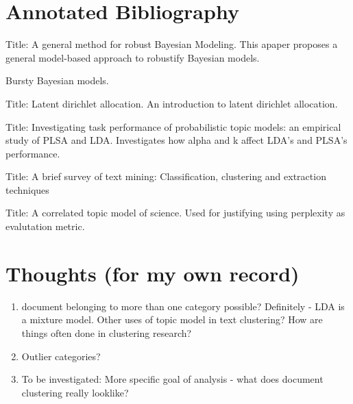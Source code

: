 \documentclass{article}
\begin{document}
\section{Annotated Bibliography}
\cite{wang2018general}
Title: A general method for robust Bayesian Modeling.
This apaper proposes a general model-based approach to robustify Bayesian models.

\cite{doyle2009accounting}
Bursty Bayesian models.

\cite{blei2003latent}
Title: Latent dirichlet allocation.
An introduction to latent dirichlet allocation.

\cite{lu2011investigating}
Title: Investigating task performance of probabilistic topic models: an empirical study of PLSA and LDA. Investigates how alpha and k affect LDA's and PLSA's performance.

\cite{allahyari2017brief}
Title: A brief survey of text mining: Classification, clustering and extraction techniques

\cite{blei2007correlated}
Title: A correlated topic model of science. Used for justifying using perplexity as evalutation metric.


\section{Thoughts (for my own record)}

\begin{enumerate}
  \item document belonging to more than one category possible? Definitely - LDA is a mixture model. Other uses of topic model in text clustering? How are things often done in clustering research? 
  \item Outlier categories?
  \item To be investigated: More specific goal of analysis - what does document clustering really looklike?
\end{enumerate}




\end{document}

